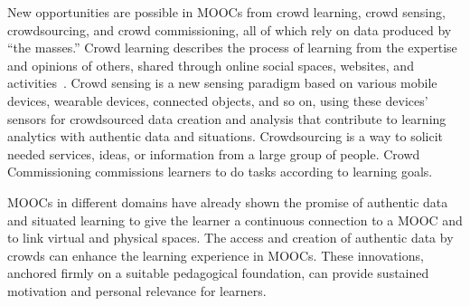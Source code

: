New opportunities are
possible in MOOCs from crowd learning, crowd sensing, crowdsourcing,
and crowd commissioning, all of which rely on data produced by ``the
masses.'' 
Crowd learning
describes the process of learning from the expertise and opinions of
others, shared through online social spaces, websites, and
activities~\cite{innovating-pedagogy-2013}. 
Crowd sensing is a new sensing
paradigm based on various mobile devices, wearable devices, connected
objects, and so on,  using these devices' sensors for crowdsourced
data creation and analysis that contribute to learning analytics with
authentic data and situations. Crowdsourcing  is a way to solicit  needed
services, ideas, or information
from a large group of people. Crowd Commissioning 
commissions learners to do tasks according to learning goals.  

MOOCs in different domains have already shown the promise of
authentic data and situated learning to give the learner a continuous
connection to a MOOC and to link virtual and physical spaces.
The access and creation of authentic data by crowds can enhance the
learning experience in MOOCs. 
These innovations, anchored firmly on a suitable pedagogical foundation,
can provide sustained motivation and personal relevance for learners.

